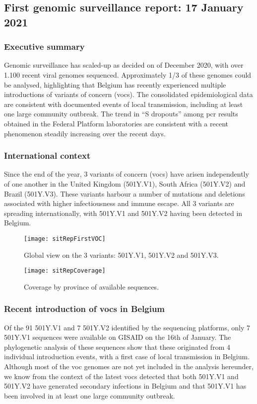 \subsection{First genomic surveillance report: 17 January 2021}
\subsubsection{Executive summary}
Genomic surveillance has scaled-up as decided on  of December 2020, with over 1.100 recent viral genomes sequenced. Approximately 1/3 of these genomes could be analysed, highlighting that Belgium has recently experienced multiple introductions of variants of concern (\gls{voc}s). The consolidated epidemiological data are consistent with documented events of local transmission, including at least one large community outbreak.
The trend in ``S dropouts'' among \gls{pcr} results obtained in the Federal Platform laboratories are consistent with a recent phenomenon steadily increasing over the recent days.

\subsubsection{International context}
Since the end of the year, 3 variants of concern (\gls{voc}s) have arisen independently of one another in the United Kingdom (501Y.V1), South Africa (501Y.V2) and Brazil (501Y.V3).
These variants harbour a number of mutations and deletions associated with higher infectiousness and immune escape.
All 3 variants are spreading internationally, with 501Y.V1 and 501Y.V2 having been detected in Belgium.

\begin{figure}[ht]
  \centering
  \texttt{[image: sitRepFirstVOC]}
  \caption[Global view on the 3 variants: 501Y.V1, 501Y.V2 and 501Y.V3]{Global view on the 3 variants: 501Y.V1, 501Y.V2 and 501Y.V3.}
  \label{fig:sitRepFirstVOC}
\end{figure}

\begin{figure}[ht]
  \centering
  \texttt{[image: sitRepCoverage]}
  \caption[Coverage by province of available sequences]{Coverage by province of available sequences.}
  \label{fig:sitRepCoverage}
\end{figure}

\subsubsection{Recent introduction of \gls{voc}s in Belgium}
Of the 91 501Y.V1 and 7 501Y.V2 identified by the sequencing platforms, only 7 501Y.V1 sequences were available on GISAID on the 16th of January.
The phylogenetic analysis of these sequences show that these originated from 4 individual introduction events, with a first case of local transmission in Belgium.
Although most of the \gls{voc} genomes are not yet included in the analysis hereunder, we know from the context of the latest \gls{voc}s detected that both 501Y.V1 and 501Y.V2 have generated secondary infections in Belgium and that 501Y.V1 has been involved in at least one large community outbreak.

